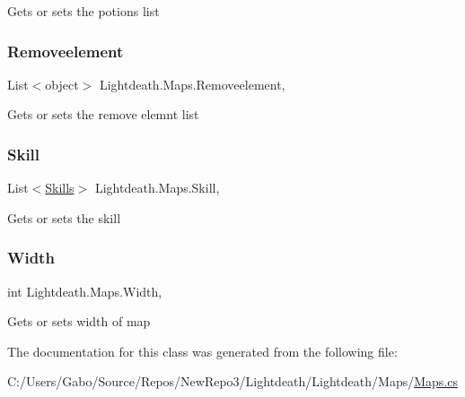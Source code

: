 Gets or sets the potions list 

\hypertarget{class_lightdeath_1_1_maps_af90bc1c0410dbcade8f89717f0eb478e}{}\label{class_lightdeath_1_1_maps_af90bc1c0410dbcade8f89717f0eb478e} 
\subsubsection{\texorpdfstring{Removeelement}{Removeelement}}
{\footnotesize\ttfamily List$<$object$>$ Lightdeath.\+Maps.\+Removeelement\hspace{0.3cm}{\ttfamily [get]}, {\ttfamily [set]}}



Gets or sets the remove elemnt list 

\hypertarget{class_lightdeath_1_1_maps_abf1b73c5a4ba428290a1a09241d764a3}{}\label{class_lightdeath_1_1_maps_abf1b73c5a4ba428290a1a09241d764a3} 
\subsubsection{\texorpdfstring{Skill}{Skill}}
{\footnotesize\ttfamily List$<$\hyperlink{class_lightdeath_1_1_skills}{Skills}$>$ Lightdeath.\+Maps.\+Skill\hspace{0.3cm}{\ttfamily [get]}, {\ttfamily [set]}}



Gets or sets the skill 

\hypertarget{class_lightdeath_1_1_maps_a7f64d70e6c35d3c3e40f344aaa86c524}{}\label{class_lightdeath_1_1_maps_a7f64d70e6c35d3c3e40f344aaa86c524} 
\subsubsection{\texorpdfstring{Width}{Width}}
{\footnotesize\ttfamily int Lightdeath.\+Maps.\+Width\hspace{0.3cm}{\ttfamily [get]}, {\ttfamily [set]}}



Gets or sets width of map 



The documentation for this class was generated from the following file\+:\begin{DoxyCompactItemize}
\item 
C\+:/\+Users/\+Gabo/\+Source/\+Repos/\+New\+Repo3/\+Lightdeath/\+Lightdeath/\+Maps/\hyperlink{_maps_8cs}{Maps.\+cs}\end{DoxyCompactItemize}
